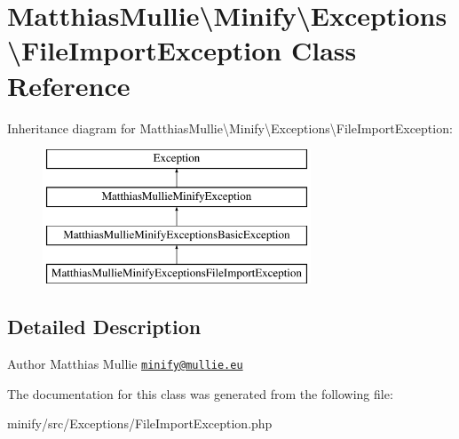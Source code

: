 \hypertarget{classMatthiasMullie_1_1Minify_1_1Exceptions_1_1FileImportException}{}\section{Matthias\+Mullie\textbackslash{}Minify\textbackslash{}Exceptions\textbackslash{}File\+Import\+Exception Class Reference}
\label{classMatthiasMullie_1_1Minify_1_1Exceptions_1_1FileImportException}
Inheritance diagram for Matthias\+Mullie\textbackslash{}Minify\textbackslash{}Exceptions\textbackslash{}File\+Import\+Exception\+:\begin{figure}[H]
\begin{center}
\leavevmode
\includegraphics[height=4.000000cm]{classMatthiasMullie_1_1Minify_1_1Exceptions_1_1FileImportException}
\end{center}
\end{figure}


\subsection{Detailed Description}
\begin{DoxyAuthor}{Author}
Matthias Mullie \href{mailto:minify@mullie.eu}{\tt minify@mullie.\+eu} 
\end{DoxyAuthor}


The documentation for this class was generated from the following file\+:\begin{DoxyCompactItemize}
\item 
minify/src/\+Exceptions/File\+Import\+Exception.\+php\end{DoxyCompactItemize}

